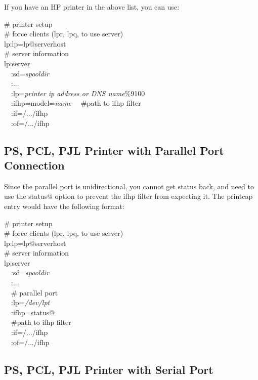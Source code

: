 \documentclass[a4paper]{article}
\begin{document}
If you have an HP printer in the above list,
you can use:
\begin{tscreen}
\# printer setup  \\ 
\#  force clients (lpr, lpq, to use server)  \\ 
lp:lp=lp@serverhost  \\ 
\# server information  \\ 
lp:server  \\ 
~~:sd={\itshape spooldir\/}  \\ 
~~:...  \\ 
~~:lp={\itshape printer ip address or DNS name\/}\%9100 \\ 
~~:ifhp=model={\itshape name\/}
~~\#path to ifhp filter  \\ 
~~:if=/.../ifhp  \\ 
~~:of=/.../ifhp  
\end{tscreen}



\subsection{PS, PCL, PJL Printer with Parallel Port Connection}

Since the parallel port is unidirectional,
you cannot get status back,
and need to use the
{\ttfamily status@} option to prevent the
{\ttfamily ifhp} filter from expecting it.
The printcap entry would have the following format:
\begin{tscreen}
\# printer setup  \\ 
\#  force clients (lpr, lpq, to use server)  \\ 
lp:lp=lp@serverhost  \\ 
\# server information  \\ 
lp:server  \\ 
~~:sd={\itshape spooldir\/}  \\ 
~~:...  \\ 
~~\# parallel port \\ 
~~:lp={\itshape /dev/lpt\/} \\ 
~~:ifhp=status@ \\ 
~~\#path to ifhp filter  \\ 
~~:if=/.../ifhp  \\ 
~~:of=/.../ifhp  
\end{tscreen}





\subsection{PS, PCL, PJL Printer with Serial Port}
\end{document}
